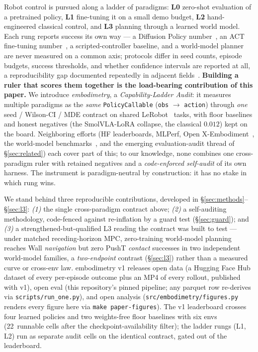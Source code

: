 \documentclass[10pt]{article}
\begin{document}
Robot control is pursued along a ladder of paradigms: \textbf{L0}
zero-shot evaluation of a
pretrained policy, \textbf{L1} fine-tuning it on a small demo
budget, \textbf{L2} hand-engineered classical control, and \textbf{L3}
planning through a learned world model. Each rung reports success its own
way --- a Diffusion Policy
number~\cite{chi2023diffusion}, an ACT fine-tuning
number~\cite{zhao2023learning}, a scripted-controller baseline, and a
world-model planner~\cite{zhou2024dinowm,assran2025vjepa2} are never
measured on a common axis; protocols differ in seed counts, episode
budgets, success thresholds, and whether confidence intervals are reported
at all, a reproducibility gap documented repeatedly in adjacent
fields~\cite{henderson2018deep,agarwal2021deep,patterson2024empirical}.
\textbf{Building a ruler
that scores them together is the load-bearing contribution of this
paper.} We introduce \emph{embodimetry}, a \emph{Capability-Ladder Audit}:
it measures multiple paradigms as the \emph{same} \texttt{PolicyCallable}
(\texttt{obs} $\to$ \texttt{action}) through \emph{one} seed / Wilson-CI /
MDE contract on shared LeRobot~\cite{cadene2024lerobot} tasks, with floor
baselines and honest negatives (the SmolVLA-LoRA collapse, the classical
$0.012$) kept on the board. Neighboring efforts (HF leaderboards, MLPerf,
Open X-Embodiment~\cite{bohg2024open}, the world-model
benchmarks~\cite{zhou2024dinowm,assran2025vjepa2}, and the emerging
evaluation-audit thread of \S\ref{sec:related}) each cover part of this;
to our knowledge, none combines one cross-paradigm ruler with retained
negatives and a \emph{code-enforced self-audit} of its own harness. The
instrument is paradigm-neutral by
construction: it has no stake in which rung wins.

We stand behind three reproducible contributions, developed in
\S\ref{sec:methods}--\S\ref{sec:l3}: \emph{(1)} the single cross-paradigm
contract above; \emph{(2)} a self-auditing methodology, code-fenced against
re-inflation by a guard test (\S\ref{sec:guard}); and \emph{(3)} a
strengthened-but-qualified L3 reading the contract was built to
test --- under matched receding-horizon MPC, zero-training world-model
planning reaches Wall \emph{navigation} but zero PushT \emph{contact}
successes in two independent world-model families, a \emph{two-endpoint}
contrast (\S\ref{sec:l3}) rather than a measured curve or cross-env law.
embodimetry v1 releases open data (a Hugging Face
Hub~\cite{huggingfacehub2024} dataset of every per-episode outcome plus an
MP4 of every rollout, published with v1), open eval (this repository's
pinned pipeline; any parquet row re-derives via
\texttt{scripts/run\_one.py}), and open analysis
(\texttt{src/embodimetry/figures.py} renders every figure here via
\texttt{make paper-figures}). The v1 leaderboard crosses four learned
policies and two weights-free floor baselines with six envs
(22~runnable cells after the checkpoint-availability filter); the ladder
rungs (L1, L2) run as separate
audit cells on the identical contract, gated out of the leaderboard.
\end{document}
